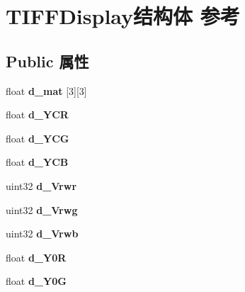 \hypertarget{struct_t_i_f_f_display}{}\section{T\+I\+F\+F\+Display结构体 参考}
\label{struct_t_i_f_f_display}
\subsection*{Public 属性}
\begin{DoxyCompactItemize}
\item 
\mbox{\label{struct_t_i_f_f_display_a04cec10cce1994afc6f2fa96b0d1d91e}} 
float {\bfseries d\+\_\+mat} \mbox{[}3\mbox{]}\mbox{[}3\mbox{]}
\item 
\mbox{\label{struct_t_i_f_f_display_a7f9ccfdd5386bb77c87fcbff291e68fc}} 
float {\bfseries d\+\_\+\+Y\+CR}
\item 
\mbox{\label{struct_t_i_f_f_display_a791a7d81bfd0ebbf7749e22b2ab1121e}} 
float {\bfseries d\+\_\+\+Y\+CG}
\item 
\mbox{\label{struct_t_i_f_f_display_a12a8b0e5283b9d1407b120180fc697d9}} 
float {\bfseries d\+\_\+\+Y\+CB}
\item 
\mbox{\label{struct_t_i_f_f_display_a0d07c9db94e97aa0dc2b23000404d6db}} 
uint32 {\bfseries d\+\_\+\+Vrwr}
\item 
\mbox{\label{struct_t_i_f_f_display_add6f95e419c169a5b3b19988c7d96a82}} 
uint32 {\bfseries d\+\_\+\+Vrwg}
\item 
\mbox{\label{struct_t_i_f_f_display_a21fa314b8d12bb6cb6182b941fc2e3ff}} 
uint32 {\bfseries d\+\_\+\+Vrwb}
\item 
\mbox{\label{struct_t_i_f_f_display_a42080c0565893b1b57585d1114ffed2e}} 
float {\bfseries d\+\_\+\+Y0R}
\item 
\mbox{\label{struct_t_i_f_f_display_a8a3da16732ffba884dac2061b33b3cc9}} 
float {\bfseries d\+\_\+\+Y0G}

\end{DoxyCompactItemize}
